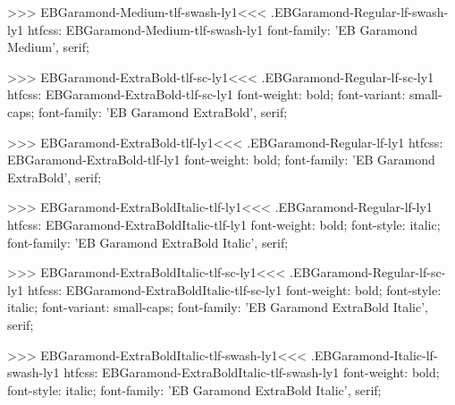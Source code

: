 {{>>>
\<EBGaramond-Medium-tlf-swash-ly1\><<<
.EBGaramond-Regular-lf-swash-ly1
htfcss:  EBGaramond-Medium-tlf-swash-ly1  font-family: 'EB Garamond Medium', serif;

>>>
\<EBGaramond-ExtraBold-tlf-sc-ly1\><<<
.EBGaramond-Regular-lf-sc-ly1
htfcss:  EBGaramond-ExtraBold-tlf-sc-ly1  font-weight: bold; font-variant: small-caps; font-family: 'EB Garamond ExtraBold', serif;

>>>
\<EBGaramond-ExtraBold-tlf-ly1\><<<
.EBGaramond-Regular-lf-ly1
htfcss:  EBGaramond-ExtraBold-tlf-ly1  font-weight: bold; font-family: 'EB Garamond ExtraBold', serif;

>>>
\<EBGaramond-ExtraBoldItalic-tlf-ly1\><<<
.EBGaramond-Regular-lf-ly1
htfcss:  EBGaramond-ExtraBoldItalic-tlf-ly1  font-weight: bold; font-style: italic; font-family: 'EB Garamond ExtraBold Italic', serif;

>>>
\<EBGaramond-ExtraBoldItalic-tlf-sc-ly1\><<<
.EBGaramond-Regular-lf-sc-ly1
htfcss:  EBGaramond-ExtraBoldItalic-tlf-sc-ly1  font-weight: bold; font-style: italic; font-variant: small-caps; font-family: 'EB Garamond ExtraBold Italic', serif;

>>>
\<EBGaramond-ExtraBoldItalic-tlf-swash-ly1\><<<
.EBGaramond-Italic-lf-swash-ly1
htfcss:  EBGaramond-ExtraBoldItalic-tlf-swash-ly1  font-weight: bold; font-style: italic; font-family: 'EB Garamond ExtraBold Italic', serif;

}}
